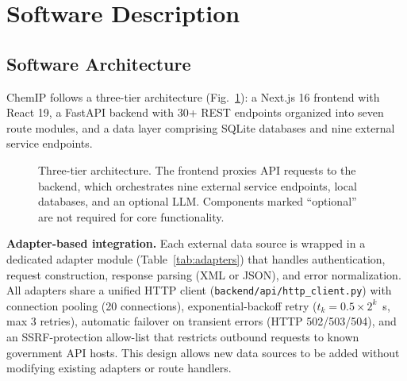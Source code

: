 \documentclass[preprint,12pt]{elsarticle}
\begin{document}

\section{Software Description}

\subsection{Software Architecture}

ChemIP follows a three-tier architecture (Fig.~\ref{fig:architecture}): a Next.js 16 frontend with React 19, a FastAPI backend with 30+ REST endpoints organized into seven route modules, and a data layer comprising SQLite databases and nine external service endpoints.

\begin{figure}[htbp]
\centering
{}
\caption{Three-tier architecture. The frontend proxies API requests to the backend, which orchestrates nine external service endpoints, local databases, and an optional LLM. Components marked ``optional'' are not required for core functionality.}
\label{fig:architecture}
\end{figure}

\textbf{Adapter-based integration.} Each external data source is wrapped in a dedicated adapter module (Table~\ref{tab:adapters}) that handles authentication, request construction, response parsing (XML or JSON), and error normalization. All adapters share a unified HTTP client (\texttt{backend/api/http\_client.py}) with connection pooling (20 connections), exponential-backoff retry ($t_k = 0.5 \times 2^k$~s, max 3 retries), automatic failover on transient errors (HTTP 502/503/504), and an SSRF-protection allow-list that restricts outbound requests to known government API hosts. This design allows new data sources to be added without modifying existing adapters or route handlers.
\end{document}
